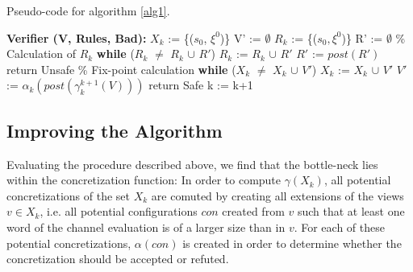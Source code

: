 \begin{algorithm}
  \caption{Pseudo-code for algorithm \ref{alg1}.}
	\label{naive}
  \begin{algorithmic}[1]
    \State \textbf{Verifier (V, Rules, Bad):}
	\State $X_k$ := \{($s_0$, $\xi^0$)\}
	\State V' := $\emptyset$
	\State $R_k$ := \{($s_0, \xi^0$)\}
	\State R' := $\emptyset$
	\State \% Calculation of $R_k$
	\State\textbf{while} ($R_k$ $\neq$ $R_k$ $\cup$ $R'$)
	\State \hspace{10pt} $R_k$ := $R_k$ $\cup$ $R'$
        \State \hspace{10pt} $R'$ := $post(R')$
        \State return Unsafe
        \EndIf 
	\State 
	\State \% Fix-point calculation
	\State\textbf{while} ($X_k$ $\neq$ $X_k$ $\cup$ $V'$)
	\State \hspace{10pt} $X_k$ := $X_k$ $\cup$ $V'$
        \State \hspace{10pt} $V'$ := $\alpha_k(post(\gamma_k^{k+1}(V)))$
         
        \State return Safe
        \EndIf
        \State k := k+1
      \EndFor
\end{algorithmic}
\end{algorithm}

\subsection{Improving the Algorithm}
Evaluating the procedure described above, we find that the bottle-neck lies within the concretization function:
 In order to compute $\gamma(X_k)$, all potential concretizations of the set $X_k$ are comuted by creating all extensions of the views $v \in X_k$, i.e. all potential configurations $con$ created from $v$ such that at least one word of the channel evaluation is of a larger size than in $v$. For each of these potential concretizations, $\alpha(con)$ is created in order to determine whether the concretization should be accepted or refuted.

